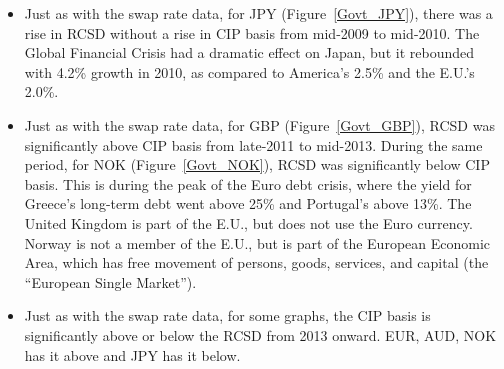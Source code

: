 \begin{itemize}
\item Just as with the swap rate data, for JPY (Figure~\ref{Govt_JPY}), there was a rise in RCSD without a rise in CIP basis from mid-2009 to mid-2010.  The Global Financial Crisis had a dramatic effect on Japan, but it rebounded with 4.2\% growth in 2010, as compared to America's 2.5\% and the E.U.'s 2.0\%. 

\item Just as with the swap rate data, for GBP (Figure~\ref{Govt_GBP}), RCSD was significantly above CIP basis from late-2011 to mid-2013.  During the same period, for NOK (Figure~\ref{Govt_NOK}), RCSD was significantly below CIP basis.  This is during the peak of the Euro debt crisis, where the yield for Greece's long-term debt went above 25\% and Portugal's above 13\%.  The United Kingdom is part of the E.U., but does not use the Euro currency.  Norway is not a member of the E.U., but is part of the European Economic Area, which has free movement of persons, goods, services, and capital (the ``European Single Market'').  

\item Just as with the swap rate data, for some graphs, the CIP basis is significantly above or below the RCSD from 2013 onward.  EUR, AUD, NOK has it above and JPY has it below.

\end{itemize}








